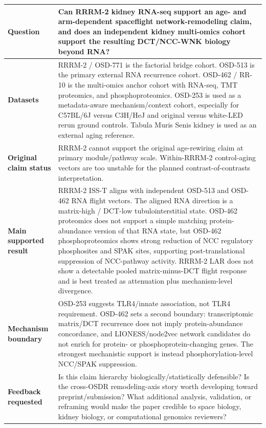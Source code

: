\documentclass[11pt]{article}
\begin{document}
\begin{tabularx}{\textwidth}{>{\bfseries}p{}X}
\toprule
Question & Can RRRM-2 kidney RNA-seq support an age- and arm-dependent spaceflight network-remodeling claim, and does an independent kidney multi-omics cohort support the resulting DCT/NCC-WNK biology beyond RNA? \\
\midrule
Datasets & RRRM-2 / OSD-771 is the factorial bridge cohort. OSD-513 is the primary external RNA recurrence cohort. OSD-462 / RR-10 is the multi-omics anchor cohort with RNA-seq, TMT proteomics, and phosphoproteomics. OSD-253 is used as a metadata-aware mechanism/context cohort, especially for C57BL/6J versus C3H/HeJ and original versus white-LED rerun ground controls. Tabula Muris Senis kidney is used as an external aging reference. \\
\midrule
Original claim status & RRRM-2 cannot support the original age-rewiring claim at primary module/pathway scale. Within-RRRM-2 control-aging vectors are too unstable for the planned contrast-of-contrasts interpretation. \\
\midrule
Main supported result & RRRM-2 ISS-T aligns with independent OSD-513 and OSD-462 RNA flight vectors. The aligned RNA direction is a matrix-high / DCT-low tubulointerstitial state. OSD-462 proteomics does not support a simple matching protein-abundance version of that RNA state, but OSD-462 phosphoproteomics shows strong reduction of NCC regulatory phosphosites and SPAK sites, supporting post-translational suppression of NCC-pathway activity. RRRM-2 LAR does not show a detectable pooled matrix-minus-DCT flight response and is best treated as attenuation plus mechanism-level divergence. \\
\midrule
Mechanism boundary & OSD-253 suggests TLR4/innate association, not TLR4 requirement. OSD-462 sets a second boundary: transcriptomic matrix/DCT recurrence does not imply protein-abundance concordance, and LIONESS/node2vec network candidates do not enrich for protein- or phosphoprotein-changing genes. The strongest mechanistic support is instead phosphorylation-level NCC/SPAK suppression. \\
\midrule
Feedback requested & Is this claim hierarchy biologically/statistically defensible? Is the cross-OSDR remodeling-axis story worth developing toward preprint/submission? What additional analysis, validation, or reframing would make the paper credible to space biology, kidney biology, or computational genomics reviewers? \\
\bottomrule
\end{tabularx}
\normalsize
\end{document}
